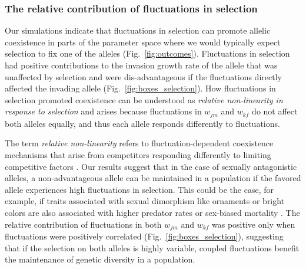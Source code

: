 \documentclass[12pt]{article}
\begin{document}
\subsubsection*{The relative contribution of fluctuations in selection}


Our simulations indicate that fluctuations in selection can promote allelic coexistence in parts of the parameter space where we would typically expect selection to fix one of the alleles (Fig.~\ref{fig:outcomes}). Fluctuations in selection had positive contributions to the invasion growth rate of the allele that was unaffected by selection and were dis-advantageous if the fluctuations directly affected the invading allele  (Fig.~\ref{fig:boxes_selection}). How fluctuations in selection promoted coexistence can be understood as \textit{relative non-linearity in response to selection} and arises because fluctuations in $w_{jm}$ and $w_{kf}$ do not affect both alleles equally, and thus each allele responds differently to fluctuations.

The term \textit{relative non-linearity} refers to fluctuation-dependent coexistence mechanisms that arise from competitors responding differently to limiting competitive factors \citep{chesson2000general,zepeda2019fluctuation}. Our results suggest that in the case of sexually antagonistic alleles, a non-advantageous allele can be maintained in a population if the favored allele experiences high fluctuations in selection. This could be the case, for example, if traits associated with sexual dimorphism like ornaments or bright colors are also associated with higher predator rates \citep{bildstein1989consequences,gotmark1997natural} or sex-biased mortality \citep{promislow1992mortality}. The relative contribution of fluctuations in both $w_{jm}$ and $w_{kf}$ was positive only when fluctuations were positively correlated (Fig.~\ref{fig:boxes_selection}), suggesting that if the selection on both alleles is highly variable, coupled fluctuations benefit the maintenance of genetic diversity in a population.
\end{document}
